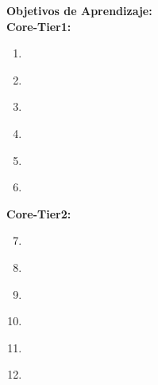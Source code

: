 \noindent \textbf{Objetivos de Aprendizaje:}\\
\noindent \textbf{Core-Tier1:}
\begin{enumerate}
	\setcounter{enumi}{0}
	\item \PLBasicTypeSystemsLOForBoth\xspace[\PLBasicTypeSystemsLOForBothLevel]\label{sec:BOK:PLBasicTypeSystemsLOForBoth}
	\item \PLBasicTypeSystemsLOForA\xspace[\PLBasicTypeSystemsLOForALevel]\label{sec:BOK:PLBasicTypeSystemsLOForA}
	\item \PLBasicTypeSystemsLODescribeExamples\xspace[\PLBasicTypeSystemsLODescribeExamplesLevel]\label{sec:BOK:PLBasicTypeSystemsLODescribeExamples}
	\item \PLBasicTypeSystemsLOForMultiple\xspace[\PLBasicTypeSystemsLOForMultipleLevel]\label{sec:BOK:PLBasicTypeSystemsLOForMultiple}
	\item \PLBasicTypeSystemsLOGiveAnThat\xspace[\PLBasicTypeSystemsLOGiveAnThatLevel]\label{sec:BOK:PLBasicTypeSystemsLOGiveAnThat}
	\item \PLBasicTypeSystemsLOUseTypes\xspace[\PLBasicTypeSystemsLOUseTypesLevel]\label{sec:BOK:PLBasicTypeSystemsLOUseTypes}
\end{enumerate}
\noindent \textbf{Core-Tier2:}
\begin{enumerate}
	\setcounter{enumi}{6}
	\item \PLBasicTypeSystemsLOExplainHowDefine\xspace[\PLBasicTypeSystemsLOExplainHowDefineLevel]\label{sec:BOK:PLBasicTypeSystemsLOExplainHowDefine}
	\item \PLBasicTypeSystemsLOWriteDown\xspace[\PLBasicTypeSystemsLOWriteDownLevel]\label{sec:BOK:PLBasicTypeSystemsLOWriteDown}
	\item \PLBasicTypeSystemsLOExplainWhyType\xspace[\PLBasicTypeSystemsLOExplainWhyTypeLevel]\label{sec:BOK:PLBasicTypeSystemsLOExplainWhyType}
	\item \PLBasicTypeSystemsLODefineAndPieces\xspace[\PLBasicTypeSystemsLODefineAndPiecesLevel]\label{sec:BOK:PLBasicTypeSystemsLODefineAndPieces}
	\item \PLBasicTypeSystemsLODiscussTheGenerics\xspace[\PLBasicTypeSystemsLODiscussTheGenericsLevel]\label{sec:BOK:PLBasicTypeSystemsLODiscussTheGenerics}
	\item \PLBasicTypeSystemsLOExplainMultiple\xspace[\PLBasicTypeSystemsLOExplainMultipleLevel]\label{sec:BOK:PLBasicTypeSystemsLOExplainMultiple}
\end{enumerate}


